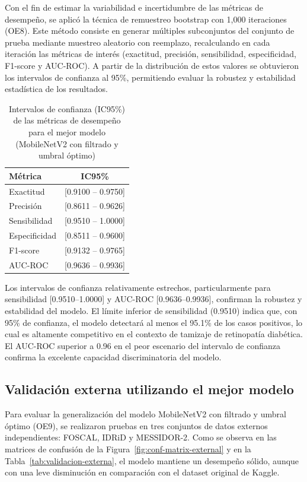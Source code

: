 Con el fin de estimar la variabilidad e incertidumbre de las métricas de desempeño, se 
aplicó la técnica de remuestreo bootstrap con 1,000 iteraciones (OE8). Este método 
consiste en generar múltiples subconjuntos del conjunto de prueba mediante muestreo 
aleatorio con reemplazo, recalculando en cada iteración las métricas de interés 
(exactitud, precisión, sensibilidad, especificidad, F1-score y AUC-ROC). A partir de la 
distribución de estos valores se obtuvieron los intervalos de confianza al 95\%, 
permitiendo evaluar la robustez y estabilidad estadística de los resultados.

\begin{table}[ht!]
	\centering
	\renewcommand{\arraystretch}{1.2}
	\caption{Intervalos de confianza (IC95\%) de las métricas de desempeño para el 
mejor modelo (MobileNetV2 con filtrado y umbral óptimo)}
	\label{tab:bootstrap-ic}
	\begin{tabular}{lc}
		\hline
		Métrica & IC95\% \\ \hline
		Exactitud & [0.9100 -- 0.9750] \\
		Precisión & [0.8611 -- 0.9626] \\
		Sensibilidad & [0.9510 -- 1.0000] \\
		Especificidad & [0.8511 -- 0.9600] \\
		F1-score & [0.9132 -- 0.9765] \\
		AUC-ROC & [0.9636 -- 0.9936] \\
		\hline
	\end{tabular}
\end{table}

Los intervalos de confianza relativamente estrechos, particularmente para sensibilidad 
[0.9510--1.0000] y AUC-ROC [0.9636--0.9936], confirman la robustez y estabilidad del 
modelo. El límite inferior de sensibilidad (0.9510) indica que, con 95\% de confianza, el 
modelo detectará al menos el 95.1\% de los casos positivos, lo cual es altamente 
competitivo en el contexto de tamizaje de retinopatía diabética. El AUC-ROC superior a 
0.96 en el peor escenario del intervalo de confianza confirma la excelente capacidad 
discriminatoria del modelo.

\subsection{Validación externa utilizando el mejor modelo}

Para evaluar la generalización del modelo MobileNetV2 con filtrado y umbral óptimo (OE9), 
se realizaron pruebas en tres conjuntos de datos externos independientes: FOSCAL, IDRiD y 
MESSIDOR-2. Como se observa en las matrices de confusión de la 
Figura~\ref{fig:conf-matrix-external} y en la Tabla~\ref{tab:validacion-externa}, el 
modelo mantiene un desempeño sólido, aunque con una leve disminución en comparación con 
el dataset original de Kaggle.

